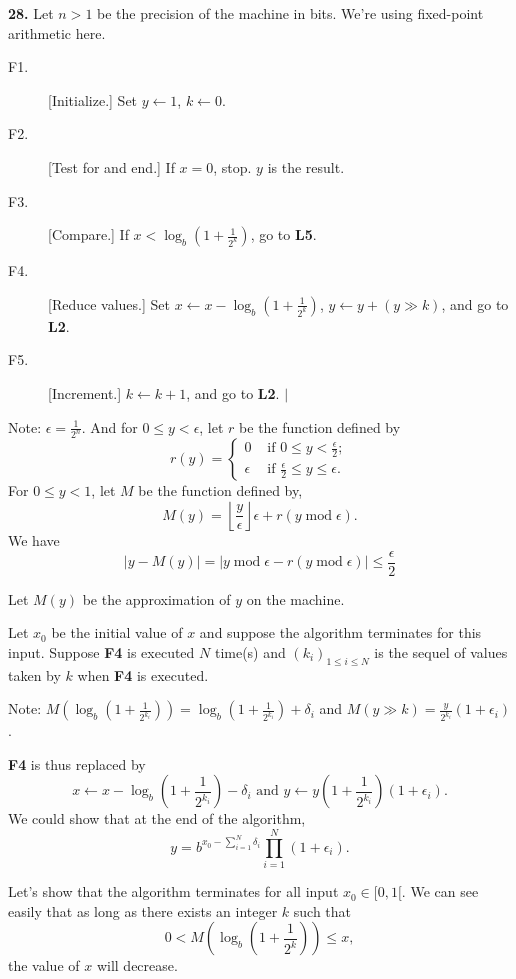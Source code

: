 \documentclass[a4paper,12pt]{article}
\newcommand{\newpar}[1]{\bigskip \noindent \textbf{#1.}}
\newcommand{\la}{\leftarrow}
\begin{document}
\newpar{28} Let $n > 1$ be the precision of the machine in bits.  We're using
fixed-point arithmetic here.  
\begin{description}
\item[F1.]
[Initialize.] Set $y \la 1$, $k \la 0$.
\item[F2.]
[Test for and end.] If $x = 0$, stop.  $y$ is the result.
\item[F3.]
[Compare.] If $x < \log_b\left(1 + \frac{1}{2^k}\right)$, go to \textbf{L5}.
\item[F4.]
[Reduce values.] Set $x \la x - \log_b\left(1 + \frac{1}{2^k}\right)$,
$y \la y + (y \gg k)$, and go to \textbf{L2}.
\item[F5.]
[Increment.] $k \la k + 1$, and go to \textbf{L2}. $|$
\end{description} Note: $\epsilon = \frac{1}{2^n}$.  
And for $0 \le y < \epsilon$, let $r$ be the function defined by
\[ r(y) = \left\{ \begin{array}{ll}
	0 & \mbox{ if } 0 \le y < \frac{\epsilon}{2};\\
	\epsilon & \mbox{ if } \frac{\epsilon}{2} \le y \le \epsilon.
        \end{array} \right. \]
For $0 \le y < 1$, let $M$ be the function defined by,
\[ M(y) = \left\lfloor \frac{y}{\epsilon} \right\rfloor \epsilon +
	r(y\; \mathrm{mod}\; \epsilon).\]
We have
\begin{equation}
\left| y - M(y) \right| =
\left|y\; \mathrm{mod}\; \epsilon - r(y\; \mathrm{mod}\; \epsilon)\right|
\le  \frac{\epsilon}{2} 
\end{equation}

Let $M(y)$ be the approximation of $y$ on the machine.

Let $x_0$ be the initial value of $x$ and suppose the algorithm terminates
for this input.  Suppose \textbf{F4} is executed $N$ time(s) and 
$(k_i)_{1 \le i \le N}$ is the sequel of values taken by $k$ when \textbf{F4}
is executed.

Note: $M\left(\log_b\left(1 + \frac{1}{2^{k_i}}\right)\right) =
\log_b\left(1 + \frac{1}{2^{k_i}}\right) + \delta_i$ and
$M(y \gg k) = \frac{y}{2^{k_i}} (1 + \epsilon_i)$.

\textbf{F4} is thus replaced by
\[ x \la x - \log_b\left(1 + \frac{1}{2^{k_i}}\right) - \delta_i \mbox{ and }
y \la y\left(1 + \frac{1}{2^{k_i}}\right)(1 + \epsilon_i).\]
We could show that at the end of the algorithm,
\[ y = b^{x_0 - \sum_{i = 1}^N \delta_i} \prod_{i=1}^N (1 + \epsilon_i).\]

\medskip
Let's show that the algorithm terminates for all input 
$x_0 \in [0, 1[$.  We can see easily that as long as there exists an 
integer $k$ such that 
\[0 < M\left(\log_b\left(1 + \frac{1}{2^{k}}\right)\right) \le x,\]
 the value of $x$ will decrease.
\end{document}
